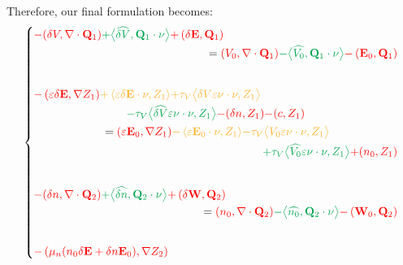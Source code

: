 \documentclass[a4paper,12pt, draft]{article}
\newcommand{\diver}[1]{\ensuremath{\nabla \cdot #1}}
\begin{document}
Therefore, our final formulation becomes:
\begin{equation*}
 \begin{dcases}
  \begin{multlined}[b][.93\textwidth]
    {\color{red} -(\delta V, \diver{\mathbf{Q}_{1}})}
      {\color{Green} + \big<\widehat{\delta V}, \mathbf{Q}_{1} \cdot \nu \big>}
      {\color{red} + \left(\delta \mathbf{E}, \mathbf{Q}_{1} \right)} \\
    = {\color{red} (V_0, \diver{\mathbf{Q}_{1}})}
      {\color{Green} - \big<\widehat{V_{0}}, \mathbf{Q}_{1} \cdot \nu \big>}
      {\color{red} - \left(\mathbf{E}_{0}, \mathbf{Q}_{1} \right)}
  \end{multlined} \\[20pt]
  \begin{multlined}[b][.93\textwidth]
    {\color{red} - \left(\varepsilon\delta \mathbf{E}, \nabla Z_{1}\right)}
      {\color{Dandelion} + \left<\varepsilon  \delta \mathbf{E}  \cdot  \nu, Z_{1}\right>}
      {\color{Dandelion} + \tau_V \big< \delta V \varepsilon \nu  \cdot \nu, Z_{1} \big>} \\
      {\color{Green} - \tau_V \big<\widehat{\delta V} \varepsilon \nu \cdot \nu, Z_{1} \big>}
      {\color{red} - ( \delta n , Z_{1})}
      {\color{red} - (c, Z_1)}\\
    = {\color{red} \left(\varepsilon \mathbf{E}_{0}, \nabla Z_{1}\right)}
      {\color{Dandelion} - \left<\varepsilon \mathbf{E}_{0} \cdot \nu, Z_{1}\right>}
      {\color{Dandelion} - \tau_V \big< V_{0} \varepsilon \nu  \cdot \nu, Z_{1} \big>} \\
      {\color{Green} + \tau_V \big<\widehat{V_{0}} \varepsilon \nu  \cdot \nu, Z_{1} \big>}
      {\color{red} + (n_{0}, Z_{1})}
  \end{multlined} \\[20pt]
  \begin{multlined}[b][.93\textwidth]
    {\color{red} -(\delta n, \diver{\mathbf{Q}_{2}})}
      {\color{Green} + \big<\widehat{\delta n}, \mathbf{Q}_{2} \cdot \nu \big>}
      {\color{red} + \left(\delta \mathbf{W}, \mathbf{Q}_{2} \right)} \\
    = {\color{red} (n_0, \diver{\mathbf{Q}_{2}})}
      {\color{Green} - \big<\widehat{n_{0}}, \mathbf{Q}_{2} \cdot \nu \big>}
      {\color{red} - \left(\mathbf{W}_{0}, \mathbf{Q}_{2} \right)}
  \end{multlined} \\[20pt]
  \begin{multlined}[b][.93\textwidth]
    {\color{red}-\left(\mu_n(n_{0}\delta\mathbf{E} + \delta n \mathbf{E}_{0}), \nabla Z_{2}\right)}

\end{multlined}
\end{dcases}
\end{equation*}
\end{document}
